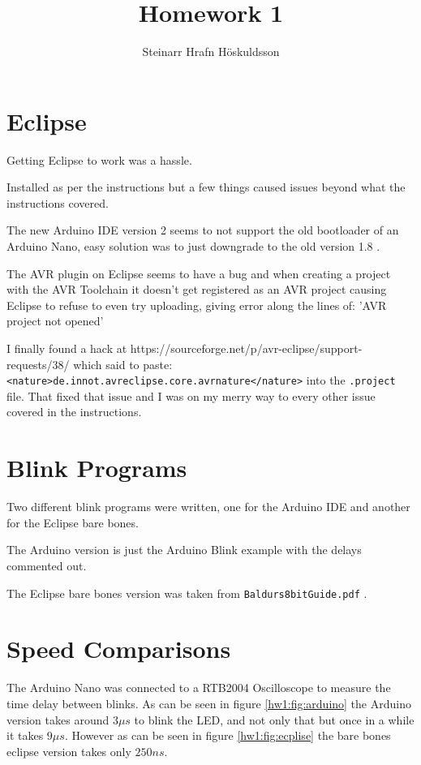 \documentclass{article}
\title{Homework 1}
\author{Steinarr Hrafn Höskuldsson}
\begin{document}
\pagestyle{firststyle}
{\let\newpage\relax\maketitle}

\section{Eclipse}
Getting Eclipse to work was a hassle.

Installed as per the instructions but a few things caused issues beyond what the instructions covered.

The new Arduino IDE version 2 seems to not support the old bootloader of an Arduino Nano, easy solution was to just downgrade to the old version 1.8 .

The AVR plugin on Eclipse seems to have a bug and when creating a project with the AVR Toolchain it doesn't get registered as an AVR project causing Eclipse to refuse to even try uploading, giving error along the lines of: 'AVR project not opened'

I finally found a hack at https://sourceforge.net/p/avr-eclipse/support-requests/38/ which said to paste: 
\verb#<nature>de.innot.avreclipse.core.avrnature</nature># into the \verb".project" file. That fixed that issue and I was on my merry way to every other issue covered in the instructions.

\section{Blink Programs}
Two different blink programs were written, one for the Arduino IDE and another for the Eclipse bare bones.

The Arduino version is just the Arduino Blink example with the delays commented out.

The Eclipse bare bones version was taken from \verb"Baldurs8bitGuide.pdf" .

\section{Speed Comparisons}

The Arduino Nano was connected to a RTB2004 Oscilloscope to measure the time delay between blinks. As can be seen in figure \ref{hw1:fig:arduino} the Arduino version takes around $3\mu s$ to blink the LED, and not only that but once in a while it takes $9\mu s$. However as can be seen in figure \ref{hw1:fig:ecplise} the bare bones eclipse version takes only $250 ns$.
\end{document}
